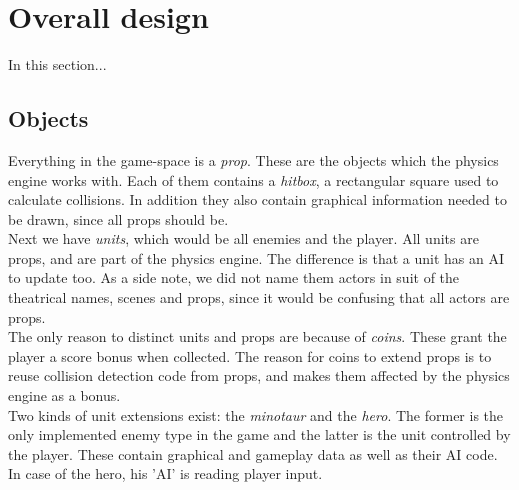 \chapter{Overall design}
In this section...\\

\section{Objects} %
Everything in the game-space is a \emph{prop}. These are the objects which the physics engine works with. Each of them contains a \emph{hitbox}, a rectangular square used to calculate collisions. In addition they also contain graphical information needed to be drawn, since all props should be.\\
Next we have \emph{units}, which would be all enemies and the player. All units are props, and are part of the physics engine. The difference is that a unit has an AI to update too. As a side note, we did not name them actors in suit of the theatrical names, scenes and props, since it would be confusing that all actors are props.\\
The only reason to distinct units and props are because of \emph{coins}. These grant the player a score bonus when collected. The reason for coins to extend props is to reuse collision detection code from props, and makes them affected by the physics engine as a bonus.\\
Two kinds of unit extensions exist: the \emph{minotaur} and the \emph{hero}. The former is the only implemented enemy type in the game and the latter is the unit controlled by the player. These contain graphical and gameplay data as well as their AI code. In case of the hero, his 'AI' is reading player input.

